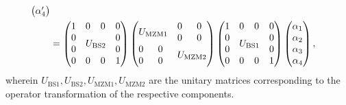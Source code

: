 \begin{equation}
\begin{split}
\begin{pmatrix}
			\alpha_4^\prime
		\end{pmatrix}
		\\
		&=
		\begin{pmatrix}
			 1 & 0 & 0 & 0 \\
			 0 & \multicolumn{2}{c}{\multirow{2}{*}{$U_\text{BS2}$}} & 0 \\
			 0 & & & 0 \\
			 0 & 0 & 0 & 1
		\end{pmatrix}
		\begin{pmatrix}
			 \multicolumn{2}{c}{\multirow{2}{*}{$U_\text{MZM1}$}} & 0 & 0 \\
			 & & 0 & 0 \\
			 0 & 0 & \multicolumn{2}{c}{\multirow{2}{*}{$U_\text{MZM2}$}} \\
			 0 & 0 & & \\
		\end{pmatrix}
		\begin{pmatrix}
			 1 & 0 & 0 & 0 \\
			 0 & \multicolumn{2}{c}{\multirow{2}{*}{$U_\text{BS1}$}} & 0 \\
			 0 & & & 0 \\
			 0 & 0 & 0 & 1
		\end{pmatrix}
		\begin{pmatrix}
			\alpha_1 \\
			\alpha_2 \\
			\alpha_3 \\
			\alpha_4
		\end{pmatrix}
		,
	\end{split}
	\label{eq:iqm_amplitude}
\end{equation}
wherein $U_\text{BS1},U_\text{BS2},U_\text{MZM1},U_\text{MZM2}$ are the unitary matrices corresponding to the operator transformation of the respective components.


